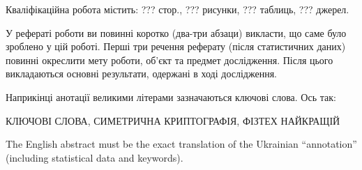 
\abstractUkr

Кваліфікаційна робота містить: ??? стор., ??? рисунки, ??? таблиць, ??? джерел.

У рефераті роботи ви повинні коротко (два-три абзаци) викласти, що саме 
було зроблено у цій роботі. Перші три речення реферату (після статистичних 
даних) повинні окреслити мету роботи, об'єкт та предмет дослідження. Після 
цього викладаються основні результати, одержані в ході дослідження.

Наприкінці анотації великими літерами зазначаються ключові слова. Ось так:

\MakeUppercase{КЛЮЧОВІ СЛОВА, СИМЕТРИЧНА КРИПТОГРАФІЯ, ФІЗТЕХ НАЙКРАЩІЙ}


%

\abstractEng

The English abstract must be the exact translation of the Ukrainian 
``annotation'' (including statistical data and keywords).

\clearpage